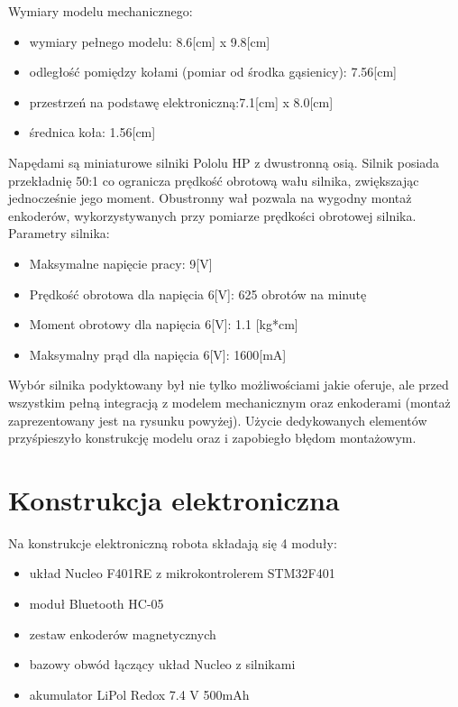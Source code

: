 \documentclass[eng,printmode]{mgr}
\begin{document}
Wymiary modelu mechanicznego:
\begin{itemize}
  \item wymiary pełnego modelu: 8.6[cm] x 9.8[cm]
  \item odległość pomiędzy kołami (pomiar od środka gąsienicy): 7.56[cm]
  \item przestrzeń na podstawę elektroniczną:7.1[cm] x 8.0[cm]
  \item średnica koła: 1.56[cm]
\end{itemize}

Napędami są miniaturowe silniki Pololu HP z dwustronną osią. Silnik posiada przekładnię 50:1 co ogranicza prędkość obrotową wału silnika, zwiększając jednocześnie jego moment. Obustronny wał pozwala na wygodny montaż enkoderów, wykorzystywanych przy pomiarze prędkości obrotowej silnika. Parametry silnika:

\begin{itemize}
  \item Maksymalne napięcie pracy: 9[V]
  \item Prędkość obrotowa dla napięcia 6[V]: 625 obrotów na minutę
  \item Moment obrotowy dla napięcia 6[V]: 1.1 [kg*cm]
  \item Maksymalny prąd dla napięcia 6[V]: 1600[mA]
\end{itemize}

Wybór silnika podyktowany był nie tylko możliwościami jakie oferuje, ale przed wszystkim pełną integracją z modelem mechanicznym oraz enkoderami (montaż zaprezentowany jest na rysunku powyżej). Użycie dedykowanych elementów przyśpieszyło konstrukcję modelu oraz i zapobiegło błędom montażowym.

 \section{Konstrukcja elektroniczna}
Na konstrukcje elektroniczną robota składają się 4 moduły:
\begin{itemize}
  \item układ Nucleo F401RE z mikrokontrolerem STM32F401
  \item moduł Bluetooth HC-05
  \item zestaw enkoderów magnetycznych 
  \item bazowy obwód łączący układ Nucleo z silnikami 
  \item akumulator LiPol Redox 7.4 V 500mAh
\end{itemize}
\end{document}
